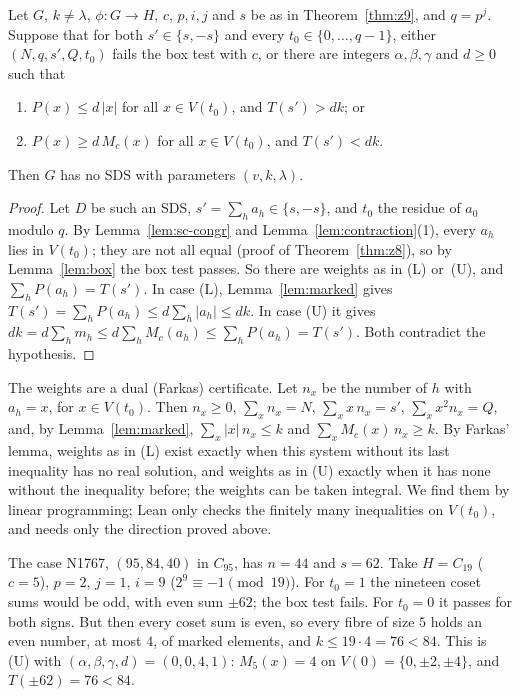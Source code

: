\begin{theorem}\label{thm:z16}
Let $G$, $k \neq \lambda$, $\phi \colon G \to H$, $c$, $p, i, j$ and $s$ be as in
Theorem~\ref{thm:z9}, and $q = p^j$. Suppose that for both $s' \in \{s, -s\}$ and every
$t_0 \in \{0, \dots, q - 1\}$, either $(N, q, s', Q, t_0)$ fails the box test with $c$, or there
are integers $\alpha, \beta, \gamma$ and $d \ge 0$ such that
\begin{enumerate}
\item[(L)] $P(x) \le d\,|x|$ for all $x \in V(t_0)$, and $T(s') > dk$; or
\item[(U)] $P(x) \ge d\,M_c(x)$ for all $x \in V(t_0)$, and $T(s') < dk$.
\end{enumerate}
Then $G$ has no SDS with parameters $(v,k,\lambda)$.
\end{theorem}

\begin{proof}
Let $D$ be such an SDS, $s' = \sum_h a_h \in \{s, -s\}$, and $t_0$ the residue of $a_0$ modulo
$q$. By Lemma~\ref{lem:sc-congr} and Lemma~\ref{lem:contraction}(1), every $a_h$ lies in
$V(t_0)$; they are not all equal (proof of Theorem~\ref{thm:z8}), so by Lemma~\ref{lem:box}
the box test passes. So there are weights as in (L)
or~(U), and $\sum_h P(a_h) = T(s')$. In case (L), Lemma~\ref{lem:marked} gives
$T(s') = \sum_h P(a_h) \le d \sum_h |a_h| \le dk$. In case (U) it gives
$dk = d \sum_h m_h \le d \sum_h M_c(a_h) \le \sum_h P(a_h) = T(s')$. Both contradict the
hypothesis.
\end{proof}

The weights are a dual (Farkas) certificate. Let $n_x$ be the number of $h$ with $a_h = x$, for
$x \in V(t_0)$. Then $n_x \ge 0$, $\sum_x n_x = N$, $\sum_x x\, n_x = s'$,
$\sum_x x^2 n_x = Q$, and, by Lemma~\ref{lem:marked}, $\sum_x |x|\, n_x \le k$ and
$\sum_x M_c(x)\, n_x \ge k$. By Farkas' lemma, weights as in (L) exist exactly when this system
without its last inequality has no real solution, and weights as in (U) exactly when it has
none without the inequality before; the weights can be taken integral. We find them by linear
programming; Lean only checks the finitely many inequalities on $V(t_0)$, and needs only the
direction proved above.

\begin{example}
The case N1767, $(95, 84, 40)$ in $C_{95}$, has $n = 44$ and $s = 62$. Take $H = C_{19}$
($c = 5$), $p = 2$, $j = 1$, $i = 9$ ($2^9 \equiv -1 \pmod{19}$). For $t_0 = 1$ the nineteen
coset sums would be odd, with even sum $\pm 62$; the box test fails. For $t_0 = 0$ it passes
for both signs. But then every coset sum is even, so every fibre of size $5$ holds an even
number, at most $4$, of marked elements, and $k \le 19 \cdot 4 = 76 < 84$. This is (U) with
$(\alpha, \beta, \gamma, d) = (0, 0, 4, 1)$: $M_5(x) = 4$ on $V(0) = \{0, \pm 2, \pm 4\}$, and
$T(\pm 62) = 76 < 84$.
\end{example}

